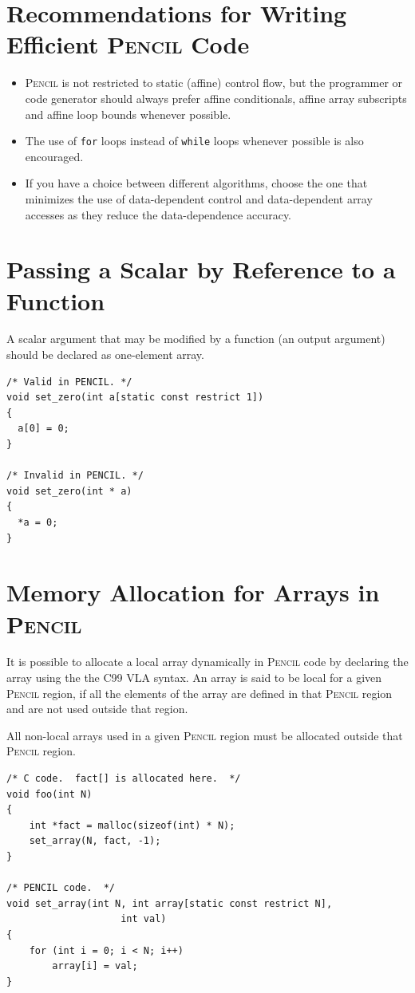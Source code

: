 \documentclass{carp}
\newcommand\pencil{\textsc{Pencil}\xspace}
\begin{document}
\section{Recommendations for Writing Efficient \pencil Code}

\begin{itemize}
\item \pencil is not restricted to static (affine) control flow, but
  the programmer or code generator should always prefer affine
  conditionals, affine array subscripts and affine loop bounds
  whenever possible.
\item The use of \lstinline!for! loops instead of \lstinline!while!
  loops whenever possible is also encouraged.
\item If you have a choice between different algorithms, choose the
  one that minimizes the use of data-dependent control and
  data-dependent array accesses as they reduce the data-dependence
  accuracy.
\end{itemize}

\section{Passing a Scalar by Reference to a Function}

A scalar argument that may be modified by a function (an output argument)
should be declared as one-element array.

\begin{lstlisting}[language=pencil]
/* Valid in PENCIL. */
void set_zero(int a[static const restrict 1])
{
  a[0] = 0;
}

/* Invalid in PENCIL. */
void set_zero(int * a)
{
  *a = 0;
}
\end{lstlisting}  

\section{Memory Allocation for Arrays in \pencil}

It is possible to allocate a local array dynamically in \pencil code
by declaring the array using the the C99 VLA syntax.
An array is said to be local for a given \pencil region, if all the
elements of the array are defined in that \pencil region and are not
used outside that region.

All non-local arrays used in a given \pencil region must be allocated
outside that \pencil region.

\begin{lstlisting}[language=pencil]
/* C code.  fact[] is allocated here.  */
void foo(int N)
{
    int *fact = malloc(sizeof(int) * N);
    set_array(N, fact, -1);
}

/* PENCIL code.  */
void set_array(int N, int array[static const restrict N],
                    int val)
{
    for (int i = 0; i < N; i++)
        array[i] = val;
}

\end{lstlisting}
\end{document}
